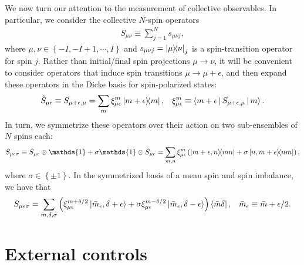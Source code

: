 \documentclass[nofootinbib,notitlepage,11pt]{revtex4-2}
\newcommand{\p}[1]{\left(#1\right)} %
\renewcommand{\set}[1]{\left\{#1\right\}} %
\newcommand{\bk}{\Braket} %
\newcommand{\1}{\mathds{1}}
\begin{document}
We now turn our attention to the measurement of collective observables.
In particular, we consider the collective $N$-spin operators
\begin{align}
  S_{\mu\nu} \equiv \sum_{j=1}^N s_{\mu\nu j},
\end{align}
where $\mu,\nu\in\set{-I,-I+1,\cdots,I}$ and $s_{\mu\nu j} = \op{\mu}{\nu}_j$ is a spin-transition operator for spin $j$.
Rather than initial/final spin projections $\mu\to\nu$, it will be convenient to consider operators that induce spin transitions $\mu\to\mu+\epsilon$, and then expand these operators in the Dicke basis for spin-polarized states:
\begin{align}
  \tilde S_{\mu\epsilon} \equiv S_{\mu+\epsilon,\mu}
  = \sum_m \xi_{\mu\epsilon}^m \op{m+\epsilon}{m},
  &&
  \xi_{\mu\epsilon}^m \equiv \bk{m+\epsilon|S_{\mu+\epsilon,\mu}|m}.
\end{align}
In turn, we symmetrize these operators over their action on two sub-ensembles of $N$ spins each:
\begin{align}
  S_{\mu\epsilon\sigma} \equiv \tilde S_{\mu\epsilon} \otimes \1
  + \sigma \1 \otimes \tilde S_{\mu\epsilon}
  = \sum_{m,n} \xi_{\mu\epsilon}^m
  \p{\op{m+\epsilon,n}{mn} + \sigma \op{n,m+\epsilon}{nm}},
\end{align}
where $\sigma\in\set{\pm1}$.
In the symmetrized basis of a mean spin and spin imbalance, we have that
\begin{align}
  S_{\mu\epsilon\sigma}= \sum_{m,\delta,\sigma} \p{\xi_{\mu\epsilon}^{m+\delta/2}
    \ket{\bar m_\epsilon,\delta+\epsilon}
    + \sigma \xi_{\mu\epsilon}^{m-\delta/2}
    \ket{\bar m_\epsilon,\delta-\epsilon}}
  \bra{\bar m\delta},
  &&
  \bar m_\epsilon \equiv \bar m + \epsilon/2.
\end{align}

\newpage

\newpage
\appendix

\section{External controls}
\label{sec:controls}
\end{document}
